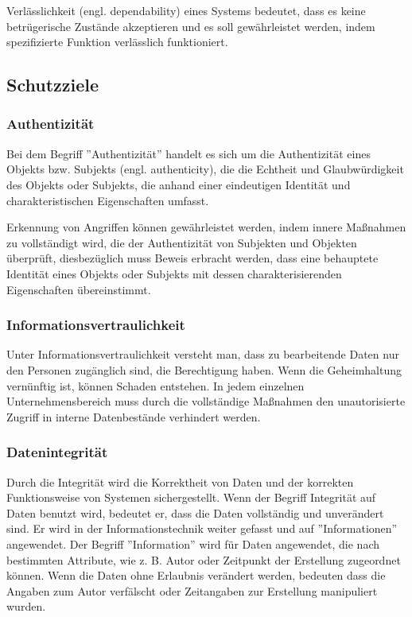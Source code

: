 Verlässlichkeit (engl. dependability) eines Systems bedeutet, dass es keine betrügerische Zustände akzeptieren und es soll gewährleistet werden, indem spezifizierte Funktion verlässlich funktioniert\cite[27]{eckert2013sicherheit}.

\subsection{Schutzziele}

\subsubsection{Authentizität}

Bei dem Begriff ''Authentizität'' handelt es sich um die Authentizität eines Objekts bzw. Subjekts (engl. authenticity), die die Echtheit und Glaubwürdigkeit des Objekts oder Subjekts, die anhand einer eindeutigen Identität und charakteristischen Eigenschaften umfasst\cite[28]{eckert2013sicherheit}.

Erkennung von Angriffen können gewährleistet werden, indem innere Maßnahmen zu vollständigt wird, die der Authentizität von Subjekten und Objekten überprüft\cite[13]{spies1985datenschutz}, diesbezüglich muss Beweis erbracht werden, dass eine behauptete Identität eines Objekts oder Subjekts mit dessen charakterisierenden Eigenschaften übereinstimmt\cite[28]{eckert2013sicherheit}.

\subsubsection{Informationsvertraulichkeit}
Unter Informationsvertraulichkeit versteht man, dass zu bearbeitende Daten nur den Personen zugänglich sind, die Berechtigung haben. Wenn die Geheimhaltung vernünftig ist, können Schaden entstehen. In jedem einzelnen Unternehmensbereich muss durch die vollständige Maßnahmen den unautorisierte Zugriff in interne Datenbestände verhindert werden\cite[205]{gora2003handbuch}.

\subsubsection{Datenintegrität}

Durch die Integrität wird die Korrektheit von Daten und der korrekten Funktionsweise von Systemen sichergestellt. Wenn der Begriff Integrität auf Daten benutzt wird, bedeutet er, dass die Daten vollständig und unverändert sind. Er wird in der Informationstechnik weiter gefasst und auf ''Informationen'' angewendet. Der Begriff ''Information'' wird für Daten angewendet, die nach bestimmten Attribute, wie z. B. Autor oder Zeitpunkt der Erstellung zugeordnet können. Wenn die Daten ohne Erlaubnis verändert werden, bedeuten dass die Angaben zum Autor verfälscht oder Zeitangaben zur Erstellung manipuliert wurden\cite{dtint2007}.


